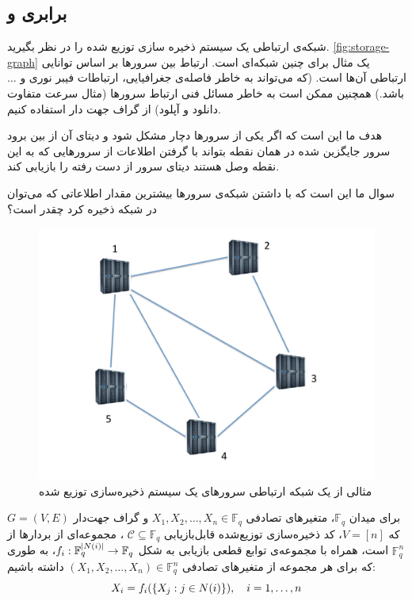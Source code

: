  \subsection{
 برابری 
 \icod
 و
 \SFRDSS
 }
\label{subsec:arya}
 شبکه‌ی ارتباطی یک سیستم ذخیره سازی توزیع شده را در نظر بگیرید.
 \autoref{fig:storage-graph}
 یک مثال برای چنین شبکه‌ای است. ارتباط بین سرورها بر اساس توانایی ارتباطی آن‌ها است. (که می‌تواند به خاطر فاصله‌ی جغرافیایی، ارتباطات فیبر نوری و
 $\text{\ldots}$
 باشد.) همچنین ممکن است به خاطر مسائل فنی ارتباط سرورها (مثال سرعت متفاوت دانلود و آپلود) از گراف جهت دار استفاده کنیم.
 
 هدف ما این است که اگر یکی از سرورها دچار مشکل شود و دیتای آن از بین برود سرور جایگزین شده در همان نقطه بتواند با گرفتن اطلاعات از سرورهایی که به این نقطه وصل هستند دیتای سرور از دست رفته را بازیابی کند.
 
 سوال ما این است که با داشتن شبکه‌ی سرورها بیشترین مقدار اطلاعاتی که می‌توان در شبکه ذخیره کرد چقدر است؟
\begin{figure}[H]
	\centering
	\includegraphics[width=0.5\linewidth]{figs/chapter6/storage-graph}
	\caption[
	مثالی از یک شبکه ارتباطی سرورهای یک سیستم ذخیره‌سازی توزیع شده]{
		مثالی از یک شبکه ارتباطی سرورهای یک سیستم ذخیره‌سازی توزیع شده
		\cite{arya}
		}
	\label{fig:storage-graph}
\end{figure}

\begin{definition}
	برای میدان
	$\mathbb{F}_{q}$،
	متغیرهای تصادفی
	$X_1, X_2, \ldots, X_n \in \mathbb{F}_{q}$
	و گراف جهت‌دار
	$G = (V, E)$
	که
	$V = [n]$،
		کد ذخیره‌سازی توزیع‌شده قابل‌بازیابی 
		$\mathcal{C} \subseteq \mathbb{F}_{q}$
		،  مجموعه‌ای از بردار‌ها از
		$\mathbb{F}^n_{q}$
		است، همراه با مجموعه‌ی توابع قطعی بازیابی به شکل
		$f_i: \mathbb{F}_q^{\left|{N(i)}\right|} \to \mathbb{F}_q$،
		به طوری که برای هر مجموعه از متغیرهای تصادفی 
		$(X_1, X_2,\dots,X_n) \in \mathbb{F}_q^n$
		داشته باشیم:
		$$X_i = f_i(\left\{ X_j: j \in N(i) \right\}), \quad i = 1,\dots,n$$
\end{definition}

